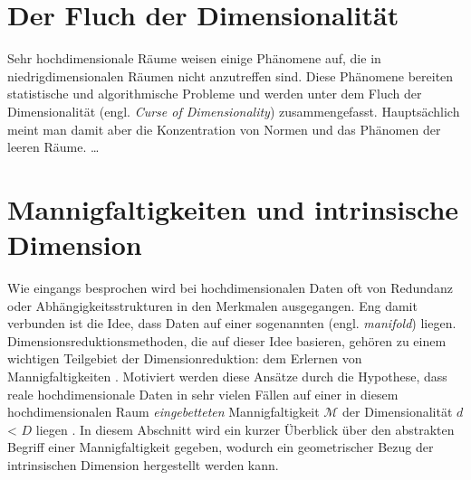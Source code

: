 \section{Der Fluch der Dimensionalität}
\label{ch:Dimensionsreduktion:FluchDerDim}

Sehr hochdimensionale Räume weisen einige Phänomene auf, die in niedrigdimensionalen Räumen nicht
anzutreffen sind. Diese Phänomene bereiten statistische und algorithmische Probleme und werden
unter dem Fluch der Dimensionalität (engl. \textit{Curse of Dimensionality}) zusammengefasst.
Hauptsächlich meint man damit aber die Konzentration von Normen und das Phänomen der leeren Räume.
\ldots

\section{Mannigfaltigkeiten und intrinsische Dimension}
\label{ch:Dimensionsreduktion:MannigfaltigkeitenIntrinsDim}

Wie eingangs besprochen wird bei hochdimensionalen Daten oft von Redundanz oder
Abhängigkeitsstrukturen in den Merkmalen ausgegangen. Eng damit verbunden ist die Idee, dass Daten
auf einer sogenannten  (engl. \textit{manifold}) liegen.
Dimensionsreduktionsmethoden, die auf dieser Idee basieren, gehören zu einem wichtigen Teilgebiet
der Dimensionreduktion: dem Erlernen von Mannigfaltigkeiten \parencite{Cayton.2005}. Motiviert werden diese Ansätze durch die Hypothese, dass reale
hochdimensionale Daten in sehr vielen Fällen auf einer in diesem hochdimensionalen Raum
\textit{eingebetteten} Mannigfaltigkeit $\mathcal{M}$ der Dimensionalität $d$ < $D$ liegen \parencite[vgl.][1]{Cayton.2005}. In diesem Abschnitt wird ein kurzer Überblick über den abstrakten
Begriff einer Mannigfaltigkeit gegeben, wodurch ein geometrischer Bezug der intrinsischen Dimension
hergestellt werden kann.

